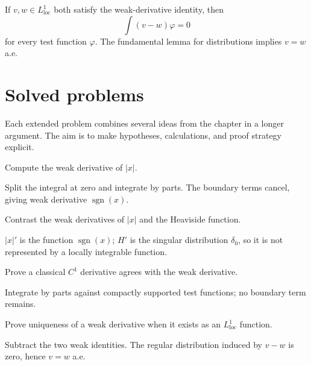 \begin{example}\label{ex:iii20-worked-04}
If \(v,w\in L^1_{\mathrm{loc}}\) both satisfy the weak-derivative identity,
then
\[
\int(v-w)\varphi=0
\]
for every test function \(\varphi\). The fundamental lemma for distributions
implies \(v=w\) a.e.
\end{example}

\section{Solved problems}
Each extended problem combines several ideas from the chapter in a longer argument. The aim is to make hypotheses, calculations, and proof strategy explicit.

\begin{problem}\label{prob:iii20-problem-01}
Compute the weak derivative of \(|x|\).
\end{problem}
\begin{solution}
Split the integral at zero and integrate by parts. The boundary terms cancel,
giving weak derivative \(\operatorname{sgn}(x)\).
\end{solution}

\begin{problem}\label{prob:iii20-problem-02}
Contrast the weak derivatives of \(|x|\) and the Heaviside function.
\end{problem}
\begin{solution}
\(|x|'\) is the function \(\operatorname{sgn}(x)\); \(H'\) is the singular
distribution \(\delta_0\), so it is not represented by a locally integrable
function.
\end{solution}

\begin{problem}\label{prob:iii20-problem-03}
Prove a classical \(C^1\) derivative agrees with the weak derivative.
\end{problem}
\begin{solution}
Integrate by parts against compactly supported test functions; no boundary
term remains.
\end{solution}

\begin{problem}\label{prob:iii20-problem-04}
Prove uniqueness of a weak derivative when it exists as an \(L^1_{\mathrm{loc}}\) function.
\end{problem}
\begin{solution}
Subtract the two weak identities. The regular distribution induced by
\(v-w\) is zero, hence \(v=w\) a.e.
\end{solution}

